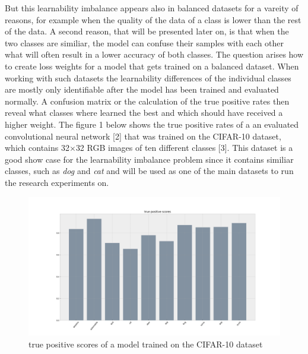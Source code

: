 \documentclass[journal]{IEEEtran}
\begin{document}

But this learnability imbalance appears also in balanced datasets for a vareity of reasons, for example when the quality of the data of a class is lower than the rest of the data. 
A second reason, that will be presented later on, is that when the two classes are similiar, 
the model can confuse their samples with each other what will often result in a lower accuracy of both classes. 
The question arises how to create loss weights for a model that gets trained on a balanced dataset. 
When working with such datasets the learnability differences of the individual classes are mostly only identifiable after the model has been trained and evaluated normally.
A confusion matrix or the calculation of the true positive rates then reveal what classes where learned the best and which should have received a higher weight.
The figure 1 below shows the true positive rates of a an evaluated convolutional neural network [2] that was trained on the CIFAR-10 dataset, which contains 32$\times$32 RGB images of ten different classes [3].
This dataset is a good show case for the learnability imbalance problem since it contains similiar classes, such as \emph{dog} and \emph{cat} and will be used as one of the main datasets to run the research experiments on.
 
\begin{figure}[h!]
        \includegraphics[width=\linewidth]{images/cifar10_tp_scores.png}
        \caption{true positive scores of a model trained on the CIFAR-10 dataset}
        \label{fig:tp_scores}
\end{figure}
\end{document}
